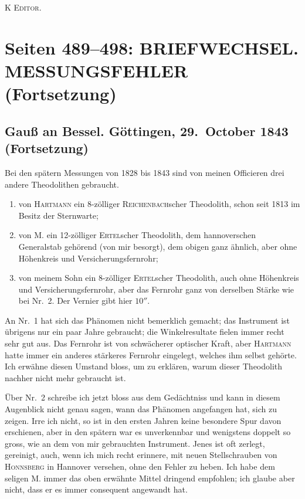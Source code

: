 \documentclass[12pt,a4paper]{article}
\theoremstyle{plain}
\theoremstyle{definition}
\theoremstyle{remark}
\begin{document}
\hfill\textsc{K Editor.}

\vfill
\eject


\section*{Seiten 489--498: BRIEFWECHSEL. MESSUNGSFEHLER (Fortsetzung)}

\subsection*{Gau\ss{} an Bessel. G\"ottingen, 29.\ October 1843 (Fortsetzung)}

Bei den sp\"atern Messungen von 1828 bis 1843 sind von meinen Officieren drei andere Theodolithen gebraucht.

\begin{enumerate}[label=\arabic*)]
\item von \textsc{Hartmann} ein 8-z\"olliger \textsc{Reichenbach}scher Theodolith, schon seit 1813 im Besitz der Sternwarte;

\item von \textsc{M.} ein 12-z\"olliger \textsc{Ertel}scher Theodolith, dem hannoverschen Generalstab geh\"orend (von mir besorgt), dem obigen ganz \"ahnlich, aber ohne H\"ohenkreis und Versicherungsfernrohr;

\item von meinem Sohn ein 8-z\"olliger \textsc{Ertel}scher Theodolith, auch ohne H\"ohenkreis und Versicherungsfernrohr, aber das Fernrohr ganz von derselben St\"arke wie bei Nr.~2. Der Vernier gibt hier $10''$.
\end{enumerate}

An Nr.~1 hat sich das Ph\"anomen nicht bemerklich gemacht; das Instrument ist \"ubrigens nur ein paar Jahre gebraucht; die Winkelresultate fielen immer recht sehr gut aus. Das Fernrohr ist von schw\"acherer optischer Kraft, aber \textsc{Hartmann} hatte immer ein anderes st\"arkeres Fernrohr eingelegt, welches ihm selbst geh\"orte. Ich erw\"ahne diesen Umstand bloss, um zu erkl\"aren, warum dieser Theodolith nachher nicht mehr gebraucht ist.

\"Uber Nr.~2 schreibe ich jetzt bloss aus dem Ged\"achtniss und kann in diesem Augenblick nicht genau sagen, wann das Ph\"anomen angefangen hat, sich zu zeigen. Irre ich nicht, so ist in den ersten Jahren keine besondere Spur davon erschienen, aber in den sp\"atern war es unverkennbar und wenigstens doppelt so gross, wie an dem von mir gebrauchten Instrument. Jenes ist oft zerlegt, gereinigt, auch, wenn ich mich recht erinnere, mit neuen Stellschrauben von \textsc{Honnsberg} in Hannover versehen, ohne den Fehler zu heben. Ich habe dem seligen \textsc{M.} immer das oben erw\"ahnte Mittel dringend empfohlen; ich glaube aber nicht, dass er es immer consequent angewandt hat.
\end{document}
